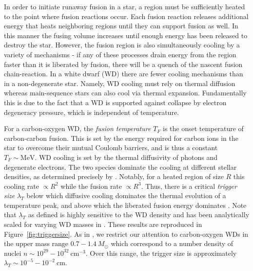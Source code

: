 \documentclass[twocolumn,showpacs,preprintnumbers,amsmath,amssymb,prl]{revtex4}
\newcommand{\MeV}{\text{MeV}}
\newcommand{\cm}{\text{cm}}
\begin{document}
In order to initiate runaway fusion in a star, a region must be sufficiently heated to the point where fusion reactions occur.  Each fusion reaction releases additional energy that heats neighboring regions until they can support fusion as well. In this manner the fusing volume increases until enough energy has been released to destroy the star.  However, the fusion region is also simultaneously cooling by a variety of mechanisms - if any of these processes drain energy from the region faster than it is liberated by fusion, there will be a quench of the nascent fusion chain-reaction. In a white dwarf (WD) there are fewer cooling mechanisms than in a non-degenerate star. Namely, WD cooling must rely on thermal diffusion whereas main-sequence stars can also cool via thermal expansion. Fundamentally this is due to the fact that a WD is supported against collapse by electron degeneracy pressure, which is independent of temperature. 

For a carbon-oxygen WD, the \emph{fusion temperature} $T_F$ is the onset temperature of carbon-carbon fusion. This is set by the energy required for carbon ions in the star to overcome their mutual Coulomb barriers, and is thus a constant $T_F \sim \MeV$. WD cooling is set by the thermal diffusivity of photons and degenerate electrons. The two species dominate the cooling at different stellar densities, as determined precisely by \cite{Woosley}. Notably, for a heated region of size $R$ this cooling rate $\propto R^2$ while the fusion rate $\propto R^3$. Thus, there is a critical \emph{trigger size} $\lambda_T$ below which diffusive cooling dominates the thermal evolution of a temperature peak, and above which the liberated fusion energy dominates \cite{Woosley}. Note that $\lambda_T$ as defined is highly sensitive to the WD density and has been analytically scaled for varying WD masses in \cite{Graham:2015apa}. These results are reproduced in Figure~\ref{fig:triggersize}. As in \cite{Graham:2015apa}, we restrict our attention to carbon-oxygen WDs in the upper mass range $0.7 - 1.4 ~M_{\odot}$ which correspond to a number density of nuclei $n \sim 10^{29} - 10^{32} ~\cm^{-3}$. Over this range, the trigger size is approximately $\lambda_T \sim 10^{-5} - 10^{-2} ~\text{cm}$. 
\end{document}
